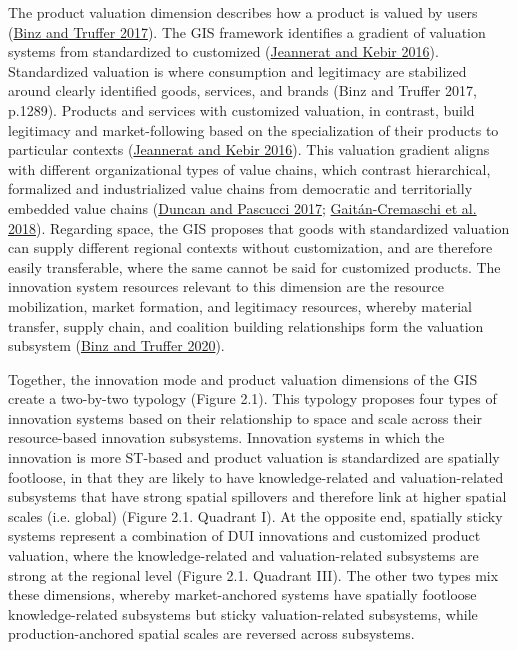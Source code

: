 \documentclass[twoside,12pt,final]{ucthesis-CA2012}
\begin{document}
\begin{ucmainmatter}
The product valuation dimension describes how a product is valued by
users (\protect\hyperlink{ref-Binz_Truffer_2017}{Binz and Truffer 2017}).
The GIS framework identifies a gradient of valuation systems from
standardized to customized
(\protect\hyperlink{ref-Jeannerat_Kebir_2016}{Jeannerat and Kebir 2016}).
Standardized valuation is where \textquotesingle consumption and legitimacy are
stabilized around clearly identified goods, services, and brands\textquotesingle{} (Binz
and Truffer 2017, p.1289). Products and services with customized
valuation, in contrast, build legitimacy and market-following based on
the specialization of their products to particular contexts
(\protect\hyperlink{ref-Jeannerat_Kebir_2016}{Jeannerat and Kebir 2016}). This
valuation gradient aligns with different organizational types of value
chains, which contrast hierarchical, formalized and industrialized value
chains from democratic and territorially embedded value chains
(\protect\hyperlink{ref-Duncan_Pascucci_2017}{Duncan and Pascucci 2017}; \protect\hyperlink{ref-Gaituxe1n-Cremaschi_Klerkx_Duncan_Trienekens_Huenchuleo_Dogliotti_Contesse_Rossing_2018}{Gaitán-Cremaschi et al. 2018}).
Regarding space, the GIS proposes that goods with standardized valuation
can supply different regional contexts without customization, and are
therefore easily transferable, where the same cannot be said for
customized products. The innovation system resources relevant to this
dimension are the resource mobilization, market formation, and
legitimacy resources, whereby material transfer, supply chain, and
coalition building relationships form the \textquotesingle valuation subsystem\textquotesingle{}
(\protect\hyperlink{ref-Binz_Truffer_2020}{Binz and Truffer 2020}).

Together, the innovation mode and product valuation dimensions of the
GIS create a two-by-two typology (Figure 2.1). This typology proposes
four types of innovation systems based on their relationship to space
and scale across their resource-based innovation subsystems. Innovation
systems in which the innovation is more ST-based and product valuation
is standardized are \textquotesingle spatially footloose\textquotesingle, in that they are likely to
have knowledge-related and valuation-related subsystems that have strong
spatial spillovers and therefore link at higher spatial scales (i.e.
\textquotesingle global\textquotesingle) (Figure 2.1. Quadrant I). At the opposite end, \textquotesingle spatially
sticky\textquotesingle{} systems represent a combination of DUI innovations and
customized product valuation, where the knowledge-related and
valuation-related subsystems are strong at the regional level (Figure
2.1. Quadrant III). The other two types mix these dimensions, whereby
\textquotesingle market-anchored\textquotesingle{} systems have spatially footloose knowledge-related
subsystems but sticky valuation-related subsystems, while
\textquotesingle production-anchored\textquotesingle{} spatial scales are reversed across subsystems.


\end{ucmainmatter}
\end{document}

